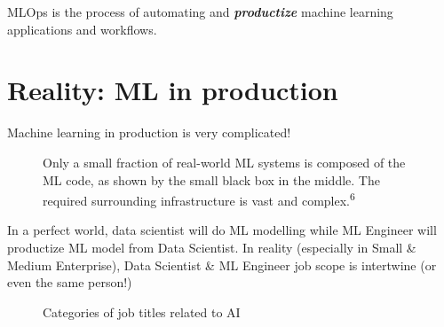 \documentclass[
  paper=6in:9in,
  pagesize=pdftex,
  headinclude=on,
  footinclude=on,
  12pt]{scrbook}
\begin{document}
MLOps is the process of automating and \emph{\textbf{productize}}
machine learning applications and workflows.

\section{Reality: ML in production}\label{reality-ml-in-production}

Machine learning in production is very complicated!

\begin{figure}[H]


\caption{\label{fig-ml-kaitan}Only a small fraction of real-world ML
systems is composed of the ML code, as shown by the small black box in
the middle. The required surrounding infrastructure is vast and
complex.\textsuperscript{6}}

\end{figure}%

In a perfect world, data scientist will do ML modelling while ML
Engineer will productize ML model from Data Scientist. In reality
(especially in Small \& Medium Enterprise), Data Scientist \& ML
Engineer job scope is intertwine (or even the same person!)

\begin{figure}[H]


\caption{\label{fig-work-list}Categories of job titles related to AI}

\end{figure}%
\end{document}
